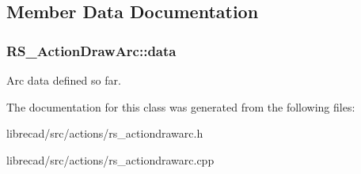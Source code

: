 \subsection{Member Data Documentation}
\hypertarget{classRS__ActionDrawArc_a8080d3fff21d9a47de9e47f904c9328d}{
\subsubsection[{data}]{ R\-S\-\_\-\-Action\-Draw\-Arc\-::data\hspace{0.3cm}{\ttfamily [protected]}}}\label{classRS__ActionDrawArc_a8080d3fff21d9a47de9e47f904c9328d}
Arc data defined so far. 

The documentation for this class was generated from the following files\-:\begin{DoxyCompactItemize}
\item 
librecad/src/actions/rs\-\_\-actiondrawarc.\-h\item 
librecad/src/actions/rs\-\_\-actiondrawarc.\-cpp\end{DoxyCompactItemize}

